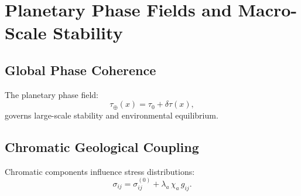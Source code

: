\chapter{Planetary Phase Fields and Macro-Scale Stability}

\section{Global Phase Coherence}
The planetary phase field:
\[
\tau_{\oplus}(x) = \tau_0 + \delta\tau(x),
\]
governs large-scale stability and environmental equilibrium.

\section{Chromatic Geological Coupling}
Chromatic components influence stress distributions:
\[
\sigma_{ij} = \sigma_{ij}^{(0)} + \lambda_a\,\chi_a\,g_{ij}.
\]

